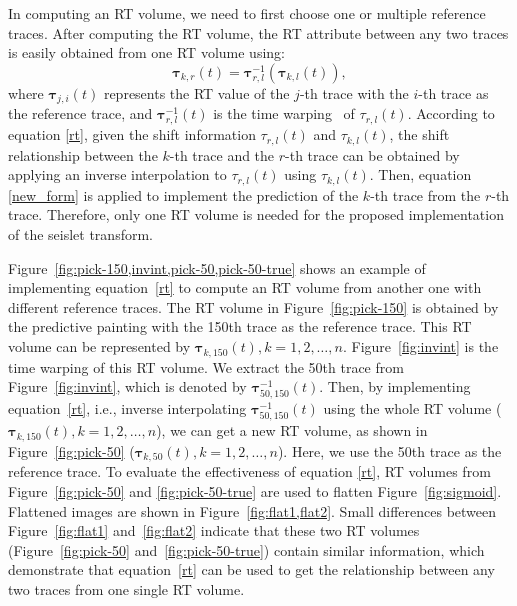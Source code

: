     In computing an RT volume, we need to first choose one or multiple reference 
    traces. 
    After computing the RT volume, the RT attribute between any two traces is 
    easily obtained from one RT volume using:
    \begin{equation}
        \label{rt}
        \mathbf{\tau}_{k,r}(t)=\mathbf{\tau}^{-1}_{r,l}(\mathbf{\tau}_{k,l}(t)),
    \end{equation}
    where $\mathbf{\tau}_{j,i}(t)$ represents the RT value of the $j$-th trace 
    with the $i$-th trace as the reference trace, and 
    $\mathbf{\tau}^{-1}_{r,l}(t)$ is the time 
    warping~\cite[]{burnett2009moveout} of $\tau_{r,l}(t)$. 
    According to equation \ref{rt}, given the shift information 
    $\tau_{r,l}(t)$ and $\tau_{k,l}(t)$, the shift relationship between the 
    $k$-th trace and the $r$-th trace can be obtained by applying an inverse 
    interpolation to $\tau_{r,l}(t)$ using $\tau_{k,l}(t)$. 
    Then, equation \ref{new_form} is applied to implement the prediction of the 
    $k$-th trace from the $r$-th trace.
    Therefore, only one RT volume is needed for the proposed implementation of 
    the seislet transform. 

    Figure~\ref{fig:pick-150,invint,pick-50,pick-50-true} shows an example of
    implementing equation~\ref{rt} to compute an RT volume from another one with 
    different reference traces. 
    The RT volume in Figure~\ref{fig:pick-150} is obtained by the predictive 
    painting with the 150th trace as the reference trace. 
    This RT volume can be represented by $\mathbf{\tau}_{k,150}(t), 
    k=1,2,\ldots,n$. 
    Figure~\ref{fig:invint} is the time warping of this RT volume. 
    We extract the 50th trace from Figure~\ref{fig:invint}, which is denoted by 
    $\mathbf{\tau}^{-1}_{50,150}(t)$. 
    Then, by implementing equation~\ref{rt}, i.e., inverse interpolating 
    $\mathbf{\tau}^{-1}_{50,150}(t)$ using the whole RT volume 
    ($\mathbf{\tau}_{k,150}(t), k=1,2,\ldots,n$), we can get a new 
    RT volume, as shown in Figure~\ref{fig:pick-50} ($\mathbf{\tau}_{k,50}(t), 
    k=1,2,\ldots,n$). Here, we use the 50th trace as the reference trace. 
    To evaluate the effectiveness of equation \ref{rt}, RT volumes from 
    Figure~\ref{fig:pick-50} and \ref{fig:pick-50-true} are used to flatten 
    Figure~\ref{fig:sigmoid}. 
    Flattened images are shown in Figure~\ref{fig:flat1,flat2}. 
    Small differences between Figure~\ref{fig:flat1} and~\ref{fig:flat2} 
    indicate that these two RT volumes (Figure~\ref{fig:pick-50} 
    and~\ref{fig:pick-50-true}) contain similar information, which demonstrate 
    that equation~\ref{rt} can be used to get the relationship between any two 
    traces from one single RT volume.
    
